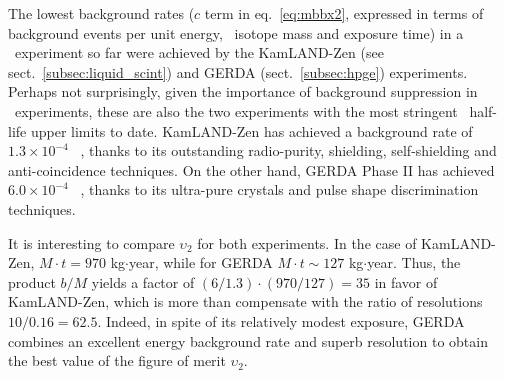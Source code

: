 The lowest background rates ($c$ term in eq.~\ref{eq:mbbx2}, expressed in terms of background events per unit energy, \bb\ isotope mass and exposure time) in a \bbonu\ experiment so far were achieved by the KamLAND-Zen (see sect.~\ref{subsec:liquid_scint}) and GERDA (sect.~\ref{subsec:hpge}) experiments. Perhaps not surprisingly, given the importance of background suppression in \bbonu\ experiments, these are also the two experiments with the most stringent \bbonu\ half-life upper limits to date. KamLAND-Zen  has achieved a background rate of $1.3\times 10^{-4}$ \ckkbby\ \cite{KamLAND-Zen:2022tow}, thanks to its outstanding radio-purity, shielding, self-shielding and anti-coincidence techniques. On the other hand, GERDA Phase II has achieved $6.0\times 10^{-4}$ \ckkbby\ \cite{GERDA:2020xhi}, thanks to its ultra-pure crystals and pulse shape discrimination techniques. 

It is interesting to compare $\upsilon_2$ for both experiments. In the case of KamLAND-Zen, $M\cdot t = 970$ kg$\cdot$year, while for GERDA 
$M\cdot t \sim 127$ kg$\cdot$year. Thus, the product $b/M$ yields a factor of 
$(6/1.3) \cdot (970/127) = 35$ in favor of KamLAND-Zen, which is more than compensate with the ratio of resolutions $10/0.16 = 62.5$. Indeed, in spite of its relatively modest exposure, GERDA combines an excellent energy background rate and superb resolution to obtain the best value of the figure of merit $\upsilon_2$. 




